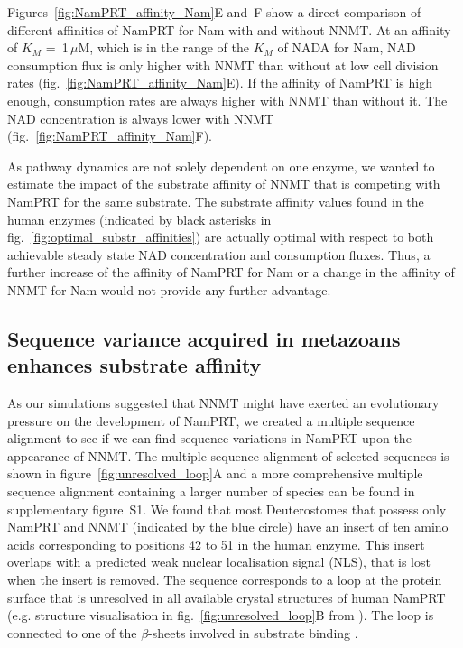 Figures~\ref{fig:NamPRT_affinity_Nam}E and~F show a direct comparison of different affinities of NamPRT for Nam with and without NNMT. At an affinity of $K_{M}$ =~1\,$\mu$M, which is in the range of the $K_{M}$ of NADA for Nam, NAD consumption flux is only higher with NNMT than without at low cell division rates (fig.~\ref{fig:NamPRT_affinity_Nam}E). If the affinity of NamPRT is high enough, consumption rates are always higher with NNMT than without it. The NAD concentration is always lower with NNMT (fig.~\ref{fig:NamPRT_affinity_Nam}F).

As pathway dynamics are not solely dependent on one enzyme, we wanted to estimate the impact of the substrate affinity of NNMT that is competing with NamPRT for the same substrate. The substrate affinity values found in the human enzymes (indicated by black asterisks in fig.~\ref{fig:optimal_substr_affinities}) are actually optimal with respect to both achievable steady state NAD concentration and consumption fluxes. Thus, a further increase of the affinity of NamPRT for Nam or a change in the affinity of NNMT for Nam would not provide any further advantage.


\subsection{Sequence variance acquired in metazoans enhances substrate affinity}

As our simulations suggested that NNMT might have exerted an evolutionary pressure on the development of NamPRT, we created a multiple sequence alignment to see if we can find sequence variations in NamPRT upon the appearance of NNMT. The multiple sequence alignment of selected sequences is shown in figure~\ref{fig:unresolved_loop}A and a more comprehensive multiple sequence alignment containing a larger number of species can be found in supplementary figure~S1. We found that most Deuterostomes that possess only NamPRT and NNMT (indicated by the blue circle) have an insert of ten amino acids corresponding to positions 42 to 51 in the human enzyme. This insert overlaps with a predicted weak nuclear localisation signal (NLS), that is lost when the insert is removed. The sequence corresponds to a loop at the protein surface that is unresolved in all available crystal structures of human NamPRT (e.g. structure visualisation in fig.~\ref{fig:unresolved_loop}B from \cite{Wang2006}). The loop is connected to one of the $\beta$-sheets involved in substrate binding \cite{Burgos2009}.

